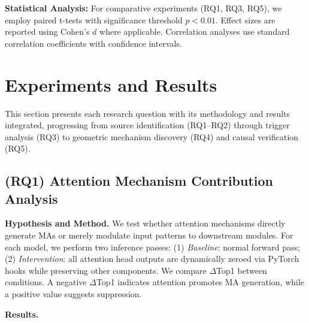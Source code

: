 \documentclass[conference]{IEEEtran}
\begin{document}
\textbf{Statistical Analysis:} For comparative experiments (RQ1, RQ3, RQ5), we employ paired t-tests with significance threshold $p < 0.01$. Effect sizes are reported using Cohen's $d$ where applicable. Correlation analyses use standard correlation coefficients with confidence intervals.


\section{Experiments and Results}

This section presents each research question with its methodology and results integrated, progressing from source identification (RQ1--RQ2) through trigger analysis (RQ3) to geometric mechanism discovery (RQ4) and causal verification (RQ5).

\subsection{(RQ1) Attention Mechanism Contribution Analysis}
\label{sec:RQ1}

\noindent\textbf{Hypothesis and Method.}
We test whether attention mechanisms directly generate MAs or merely modulate input patterns to downstream modules. For each model, we perform two inference passes: (1) \textit{Baseline}: normal forward pass; (2) \textit{Intervention}: all attention head outputs are dynamically zeroed via PyTorch hooks while preserving other components. We compare $\Delta$Top1 between conditions. A negative $\Delta$Top1 indicates attention promotes MA generation, while a positive value suggests suppression.

\smallskip
\noindent\textbf{Results.}
\end{document}
